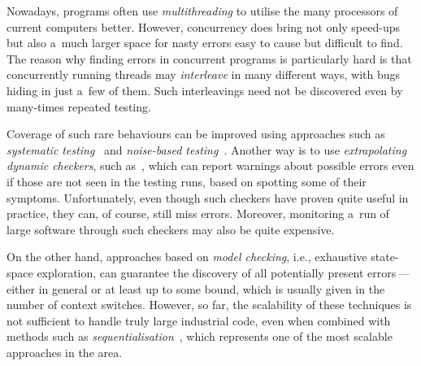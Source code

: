 \documentclass[runningheads]{llncs}
\begin{document}
Nowadays, programs often use \emph{multithreading} to utilise the many
processors of current computers better. However, concurrency does bring not
only speed-ups but also a~much larger space for nasty errors easy to cause
but difficult to find. The reason why finding errors in concurrent programs
is particularly hard is that concurrently running threads may
\emph{interleave} in many different ways, with bugs hiding in just a~few of
them. Such interleavings need not be discovered even by many-times repeated
testing.

Coverage of such rare behaviours can be improved using approaches such
as \emph{systematic testing}~\cite{schedspec12} and \emph{noise-based
testing}~\cite{contestframework03,noise15,anaconda}.
Another way is to use \emph{extrapolating dynamic checkers}, such
as~\cite{fasttrack09,velodrome08}, which can report warnings about possible
errors even if those are not seen in the testing runs, based on spotting
some of their symptoms. Unfortunately, even though such checkers have
proven quite useful in practice, they can, of course, still miss errors.
Moreover, monitoring a~run of large software through such checkers may also
be quite expensive.

On the other hand, approaches based on \emph{model checking}, i.e., exhaustive
state-space exploration, can guarantee the discovery of all potentially
present errors\,---\,either in general or at least up to some bound, which
is usually given in the number of context switches. However, so far, the
scalability of these techniques is not sufficient to handle truly large
industrial code, even when combined with methods such as
\emph{sequentialisation}~\cite{lal-reps-08,lazy-seq-16}, which represents
one of the most scalable approaches in the area.
\end{document}
